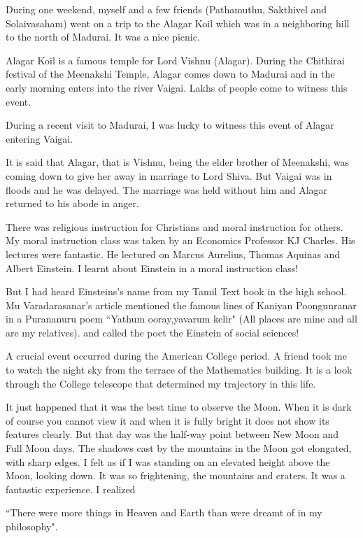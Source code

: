 During one weekend, myself and a few friends (Pathamuthu, Sakthivel and 
Solaivasaham) went on a trip to the Alagar Koil which was in a 
neighboring hill to the north of Madurai. It was a nice picnic.

Alagar Koil is a famous temple for Lord Vishnu (Alagar). During the 
Chithirai festival of the Meenakshi Temple, Alagar comes down to 
Madurai and in the early morning enters into the river Vaigai. Lakhs of 
people come to witness this event.

During a recent visit to Madurai, I was lucky to witness this event of 
Alagar entering Vaigai.

It is said that Alagar, that is Vishnu, being the elder brother of 
Meenakshi, was coming down to give her away in marriage to Lord Shiva. 
But Vaigai was in floods and he was delayed. The marriage was held 
without him and Alagar returned to his abode in anger.
 
There was religious instruction for Christians and moral instruction for 
others. My moral instruction class was taken by an Economics Professor 
KJ Charles. His lectures were fantastic. He lectured on Marcus Aurelius, 
Thomas Aquinas and Albert Einstein. I learnt about Einstein in a moral 
instruction class!

But I had heard Einsteins's name from my Tamil Text book in the high 
school. Mu Varadarasanar's article mentioned the famous lines of Kaniyan 
Poongunranar in a Purananuru poem
          ``Yathum ooray,yavarum kelir"
(All places are mine and all are my relatives).
and called the poet the Einstein of social sciences!   

A crucial event occurred during the American College period. A friend 
took me to watch the night sky from the terrace of the Mathematics 
building. It is a look through the College telescope that determined my 
trajectory in this life.

It just happened that it was the best time to observe the Moon. When it 
is dark of course you cannot view it and when it is fully bright it does 
not show its features clearly. But that day was the half-way point 
between New Moon and Full Moon days. The shadows cast by the mountains 
in the Moon got elongated, with sharp edges. I felt as if I was standing 
on an elevated height above the Moon, looking down. It was so 
frightening, the mountains and craters. It was a fantastic experience. I 
realized

``There were more things in Heaven and Earth than were dreamt of in my 
philosophy".

